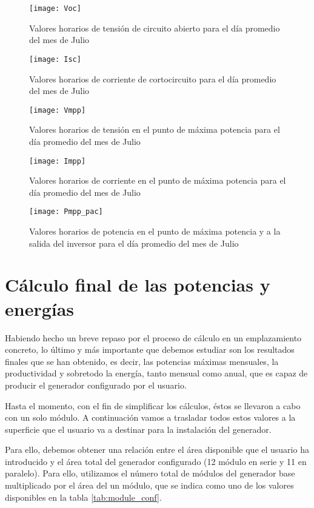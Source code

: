 \begin{figure}[H]
\texttt{[image: Voc]}
\centering
\caption{Valores horarios de tensión de circuito abierto para el día promedio del mes de Julio}
\label{fig:Voc}
\end{figure}

\begin{figure}[H]
\texttt{[image: Isc]}
\centering
\caption{Valores horarios de corriente de cortocircuito para el día promedio del mes de Julio}
\label{fig:isc}
\end{figure}

\begin{figure}[H]
\texttt{[image: Vmpp]}
\centering
\caption{Valores horarios de tensión en el punto de máxima potencia para el día promedio del mes de Julio}
\label{fig:vmpp}
\end{figure}

\begin{figure}[H]
\texttt{[image: Impp]}
\centering
\caption{Valores horarios de corriente en el punto de máxima potencia para el día promedio del mes de Julio}
\label{fig:impp}
\end{figure}

\begin{figure}[H]
\texttt{[image: Pmpp\_pac]}
\centering
\caption{Valores horarios de potencia en el punto de máxima potencia y a la salida del inversor para el día promedio del mes de Julio}
\label{fig:pmpp}
\end{figure}

\section{Cálculo final de las potencias y energías}

Habiendo hecho un breve repaso por el proceso de cálculo en un emplazamiento concreto, lo último y más importante que debemos estudiar son los resultados finales que se han obtenido, es decir, las potencias máximas mensuales, la productividad y sobretodo la energía, tanto mensual como anual, que es capaz de producir el generador configurado por el usuario.

Hasta el momento, con el fin de simplificar los cálculos, éstos se llevaron a cabo con un solo módulo. A continuación vamos a trasladar todos estos valores a la superficie que el usuario va a destinar para la instalación del generador.

Para ello, debemos obtener una relación entre el área disponible que el usuario ha introducido y el área total del generador configurado (12 módulo en serie y 11 en paralelo). Para ello, utilizamos el número total de módulos del generador base multiplicado por el área del un módulo, que se indica como uno de los valores disponibles en la tabla \ref{tab:module_conf}. 

